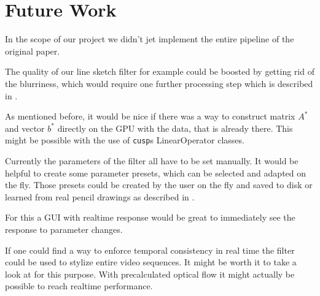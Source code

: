 \section{Future Work} \label{future-work}
In the scope of our project we didn't jet implement the entire pipeline of the
original paper. 

The quality of our line sketch filter for example could be boosted by getting
rid of the blurriness, which would require one further processing step which is
described in \cite{mainPaper}.

As mentioned before, it would be nice if there was a way to construct matrix
$A^*$ and vector $b^*$ directly on the GPU with the data, that is already
there. This might be possible with the use of \texttt{cusp}s LinearOperator
classes.

Currently the parameters of the filter all have to be set manually. It would be
helpful to create some parameter presets, which can be selected and adapted on
the fly. Those presets could be created by the user on the fly and saved to disk
or learned from real pencil drawings as described in \cite{mainPaper}.

For this a GUI with realtime response would be great to immediately see the
response to parameter changes. 

If one could find a way to enforce temporal consistency in real time the filter
could be used to stylize entire video sequences. It might be worth it to take a
look at \cite{temporal-consistency} for this purpose. With precalculated optical
flow it might actually be possible to reach realtime performance.
